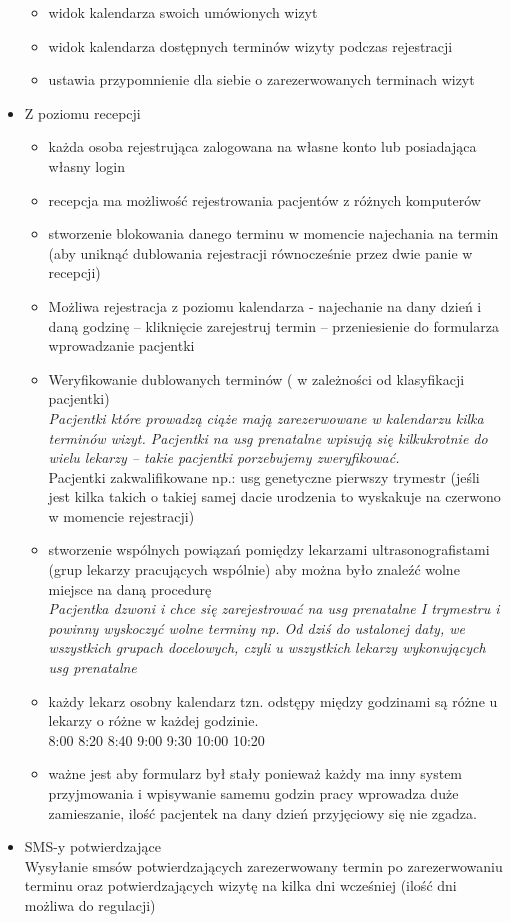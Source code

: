 \documentclass[polish,12pt]{aghthesis}
\begin{document}
\begin{itemize}
\begin{itemize}
      \item widok kalendarza swoich umówionych wizyt
      \item widok kalendarza dostępnych terminów wizyty podczas rejestracji
      \item ustawia przypomnienie dla siebie o zarezerwowanych terminach wizyt
    \end{itemize}
    \item Z poziomu recepcji \begin{itemize}
        \item każda osoba rejestrująca zalogowana na własne konto lub posiadająca własny login
        \item recepcja ma możliwość rejestrowania pacjentów z różnych komputerów
        \item stworzenie blokowania danego terminu w momencie najechania na termin (aby uniknąć dublowania rejestracji równocześnie przez dwie panie w recepcji)
        \item Możliwa rejestracja z poziomu kalendarza  - najechanie na dany dzień i daną godzinę – kliknięcie zarejestruj termin – przeniesienie do formularza wprowadzanie pacjentki
        \item Weryfikowanie dublowanych terminów  ( w zależności od klasyfikacji pacjentki)  \\
        \emph{Pacjentki które prowadzą ciąże mają zarezerwowane w kalendarzu kilka terminów wizyt. Pacjentki na usg prenatalne wpisują się kilkukrotnie do wielu lekarzy – takie pacjentki porzebujemy zweryfikować.} \\
        Pacjentki zakwalifikowane np.: usg genetyczne pierwszy trymestr (jeśli jest kilka takich o takiej samej dacie urodzenia to wyskakuje na czerwono w momencie rejestracji)
        \item stworzenie wspólnych powiązań pomiędzy lekarzami ultrasonografistami (grup lekarzy pracujących wspólnie) aby można było znaleźć wolne miejsce na daną procedurę \\
        \emph{Pacjentka dzwoni i chce się zarejestrować na usg prenatalne I trymestru i powinny wyskoczyć wolne terminy np. Od dziś do ustalonej daty, we wszystkich grupach docelowych, czyli u wszystkich lekarzy wykonujących usg prenatalne}
        \item każdy lekarz osobny kalendarz  tzn. odstępy między godzinami są różne u lekarzy o różne w każdej godzinie. \\
        8:00 8:20 8:40 9:00  9:30 10:00 10:20
        \item ważne jest aby formularz był stały ponieważ każdy ma inny system przyjmowania i wpisywanie samemu godzin pracy wprowadza duże zamieszanie, ilość pacjentek na dany dzień przyjęciowy się nie zgadza. 
    \end{itemize}
    \item SMS-y potwierdzające \\
    Wysyłanie smsów potwierdzających zarezerwowany termin po zarezerwowaniu terminu oraz potwierdzających wizytę na kilka dni wcześniej (ilość dni możliwa do regulacji) 
\end{itemize} 
 
\end{document}
